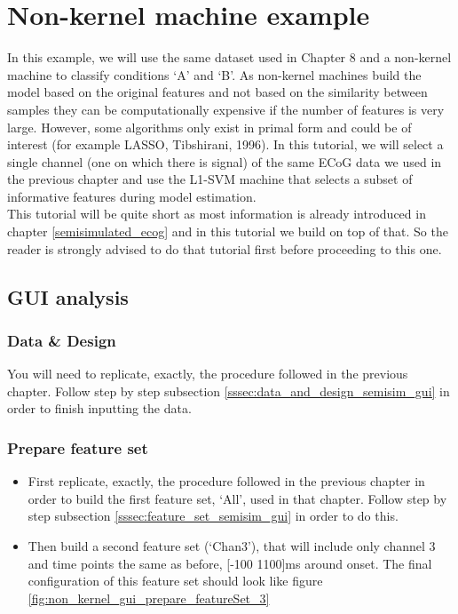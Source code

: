 
\chapter{Non-kernel machine example}
\label{non_kernel_machine_tutorial}
\minitoc

In this example, we will use the same dataset used in Chapter 8 and a non-kernel machine to classify conditions `A' and `B'. As non-kernel machines build the model based on the original features and not based on the similarity between samples they can be computationally expensive if the number of features is very large. However, some algorithms only exist in primal form and could be of interest (for example LASSO, Tibshirani, 1996). In this tutorial, we will select a single channel (one on which there is signal) of the same ECoG data we used in the previous chapter and use the L1-SVM machine that selects a subset of informative features during model estimation.
\\

This tutorial will be quite short as most information is already introduced in chapter \ref{semisimulated_ecog} and in this tutorial we build on top of that. So the reader is strongly advised to do that tutorial first before proceeding to this one.

\section{GUI analysis}


\subsection{Data \& Design}

You will need to replicate, exactly, the procedure followed in the previous chapter. Follow step by step subsection \ref{sssec:data_and_design_semisim_gui} in order to finish inputting the data.


\subsection{Prepare feature set}

\begin{itemize}
    \item First replicate, exactly, the procedure followed in the previous chapter in order to build the first feature set, `All', used in that chapter. Follow step by step subsection \ref{sssec:feature_set_semisim_gui} in order to do this.
    
    \item Then build a second feature set (`Chan3'), that will include only channel 3 and time points the same as before, [-100 1100]ms around onset. The final configuration of this feature set should look like figure \ref{fig:non_kernel_gui_prepare_featureSet_3}

\end{itemize}

